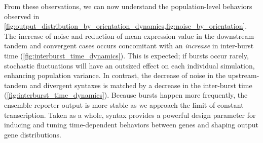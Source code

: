 \documentclass[11pt]{article} %
\begin{document}
From these observations, we can now understand the population-level behaviors observed in \cref{fig:output_distribution_by_orientation_dynamics,fig:noise_by_orientation}. 
The increase of noise and reduction of mean expression value in the downstream-tandem and convergent cases occurs concomitant with an \emph{increase} in inter-burst time (\cref{fig:interburst_time_dynamics}). This is expected; if bursts occur rarely, stochastic fluctuations will have an outsized effect on each individual simulation, enhancing population variance. In contrast, the decrease of noise in the upstream-tandem and divergent syntaxes is matched by a decrease in the inter-burst time (\cref{fig:interburst_time_dynamics}). Because bursts happen more frequently, the ensemble reporter output is more stable as we approach the limit of constant transcription.
Taken as a whole, syntax provides a powerful design parameter for inducing and tuning time-dependent behaviors between genes and shaping output gene distributions.

\FloatBarrier
\end{document}
